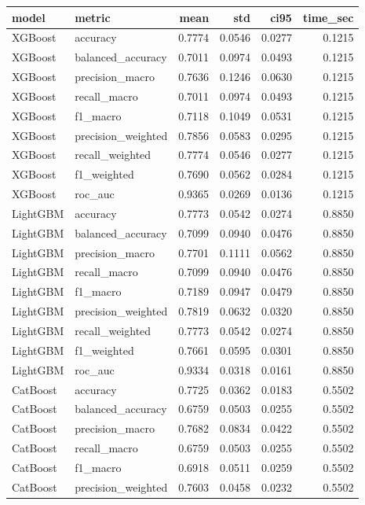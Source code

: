 \begin{tabular}{llrrrr}
\toprule
model & metric & mean & std & ci95 & time_sec \\
\midrule
XGBoost & accuracy & 0.7774 & 0.0546 & 0.0277 & 0.1215 \\
XGBoost & balanced_accuracy & 0.7011 & 0.0974 & 0.0493 & 0.1215 \\
XGBoost & precision_macro & 0.7636 & 0.1246 & 0.0630 & 0.1215 \\
XGBoost & recall_macro & 0.7011 & 0.0974 & 0.0493 & 0.1215 \\
XGBoost & f1_macro & 0.7118 & 0.1049 & 0.0531 & 0.1215 \\
XGBoost & precision_weighted & 0.7856 & 0.0583 & 0.0295 & 0.1215 \\
XGBoost & recall_weighted & 0.7774 & 0.0546 & 0.0277 & 0.1215 \\
XGBoost & f1_weighted & 0.7690 & 0.0562 & 0.0284 & 0.1215 \\
XGBoost & roc_auc & 0.9365 & 0.0269 & 0.0136 & 0.1215 \\
LightGBM & accuracy & 0.7773 & 0.0542 & 0.0274 & 0.8850 \\
LightGBM & balanced_accuracy & 0.7099 & 0.0940 & 0.0476 & 0.8850 \\
LightGBM & precision_macro & 0.7701 & 0.1111 & 0.0562 & 0.8850 \\
LightGBM & recall_macro & 0.7099 & 0.0940 & 0.0476 & 0.8850 \\
LightGBM & f1_macro & 0.7189 & 0.0947 & 0.0479 & 0.8850 \\
LightGBM & precision_weighted & 0.7819 & 0.0632 & 0.0320 & 0.8850 \\
LightGBM & recall_weighted & 0.7773 & 0.0542 & 0.0274 & 0.8850 \\
LightGBM & f1_weighted & 0.7661 & 0.0595 & 0.0301 & 0.8850 \\
LightGBM & roc_auc & 0.9334 & 0.0318 & 0.0161 & 0.8850 \\
CatBoost & accuracy & 0.7725 & 0.0362 & 0.0183 & 0.5502 \\
CatBoost & balanced_accuracy & 0.6759 & 0.0503 & 0.0255 & 0.5502 \\
CatBoost & precision_macro & 0.7682 & 0.0834 & 0.0422 & 0.5502 \\
CatBoost & recall_macro & 0.6759 & 0.0503 & 0.0255 & 0.5502 \\
CatBoost & f1_macro & 0.6918 & 0.0511 & 0.0259 & 0.5502 \\
CatBoost & precision_weighted & 0.7603 & 0.0458 & 0.0232 & 0.5502 \\

\end{tabular}
